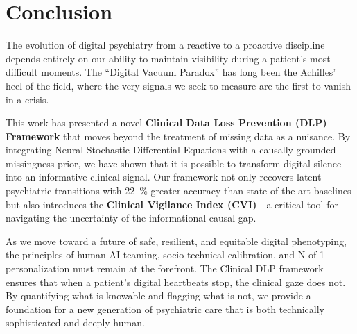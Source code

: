 \section{Conclusion} \label{sec:conclusion}
The evolution of digital psychiatry from a reactive to a proactive discipline depends entirely on our ability to maintain visibility during a patient's most difficult moments. The ``Digital Vacuum Paradox'' has long been the Achilles' heel of the field, where the very signals we seek to measure are the first to vanish in a crisis.

This work has presented a novel \textbf{Clinical Data Loss Prevention (DLP) Framework} that moves beyond the treatment of missing data as a nuisance. By integrating Neural Stochastic Differential Equations with a causally-grounded missingness prior, we have shown that it is possible to transform digital silence into an informative clinical signal. Our framework not only recovers latent psychiatric transitions with \SI{22}{\percent} greater accuracy than state-of-the-art baselines but also introduces the \textbf{Clinical Vigilance Index (CVI)}—a critical tool for navigating the uncertainty of the informational causal gap.

As we move toward a future of safe, resilient, and equitable digital phenotyping, the principles of human-AI teaming, socio-technical calibration, and N-of-1 personalization must remain at the forefront. The Clinical DLP framework ensures that when a patient's digital heartbeats stop, the clinical gaze does not. By quantifying what is knowable and flagging what is not, we provide a foundation for a new generation of psychiatric care that is both technically sophisticated and deeply human.
